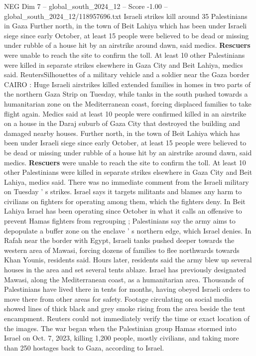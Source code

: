 \begin{textsample}{NEG Dim 7 – global\_south\_2024\_12 – Score -1.00 – global\_south\_2024\_12/118957696.txt}  \label{ex:f7_neg_104}
Israeli strikes kill around 35 Palestinians in Gaza Further north, in the town of Beit Lahiya which has been under Israeli siege since early October, at least 15 people were believed to be dead or missing under rubble of a house hit by an airstrike around dawn, said medics. \textbf{Rescuers} were unable to reach the site to confirm the toll.
At least 10 other Palestinians were killed in separate strikes elsewhere in Gaza City and Beit Lahiya, medics said.
ReutersSilhouettes of a military vehicle and a soldier near the Gaza border CAIRO : Huge Israeli airstrikes killed extended families in homes in two parts of the northern Gaza Strip on Tuesday, while tanks in the south pushed towards a humanitarian zone on the Mediterranean coast, forcing displaced families to take flight again.
Medics said at least 10 people were confirmed killed in an airstrike on a house in the Daraj suburb of Gaza City that destroyed the building and damaged nearby houses.
Further north, in the town of Beit Lahiya which has been under Israeli siege since early October, at least 15 people were believed to be dead or missing under rubble of a house hit by an airstrike around dawn, said medics. \textbf{Rescuers} were unable to reach the site to confirm the toll.
At least 10 other Palestinians were killed in separate strikes elsewhere in Gaza City and Beit Lahiya, medics said.
There was no immediate comment from the Israeli military on Tuesday ' s strikes.
Israel says it targets militants and blames any harm to civilians on fighters for operating among them, which the fighters deny.
In Beit Lahiya Israel has been operating since October in what it calls an offensive to prevent Hamas fighters from regrouping ; Palestinians say the army aims to depopulate a buffer zone on the enclave ' s northern edge, which Israel denies.
In Rafah near the border with Egypt, Israeli tanks pushed deeper towards the western area of Mawasi, forcing dozens of families to flee northwards towards Khan Younis, residents said.
Hours later, residents said the army blew up several houses in the area and set several tents ablaze.
Israel has previously designated Mawasi, along the Mediterranean coast, as a humanitarian area.
Thousands of Palestinians have lived there in tents for months, having obeyed Israeli orders to move there from other areas for safety.
Footage circulating on social media showed lines of thick black and grey smoke rising from the area beside the tent encampment.
Reuters could not immediately verify the time or exact location of the images.
The war began when the Palestinian group Hamas stormed into Israel on Oct. 7, 2023, killing 1,200 people, mostly civilians, and taking more than 250 hostages back to Gaza, according to Israel.

\end{textsample}
